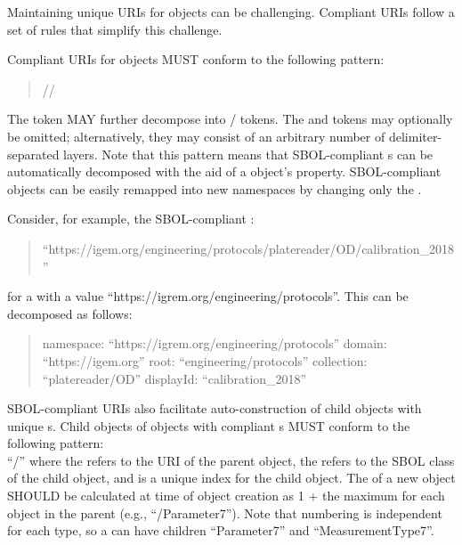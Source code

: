 Maintaining unique URIs for objects can be challenging.  Compliant URIs follow a set of rules that simplify this challenge.

Compliant URIs for  objects MUST conform to the following pattern:
\begin{quotation} 
//
\end{quotation}

The  token MAY further decompose into / tokens. The  and  tokens may optionally be omitted; alternatively, they may consist of an arbitrary number of delimiter-separated layers. Note that this pattern means that SBOL-compliant s can be automatically decomposed with the aid of a  object's  property. SBOL-compliant objects can be easily remapped into new namespaces by changing only the .

Consider, for example, the SBOL-compliant :
\begin{quote}``https://igem.org/engineering/protocols/platereader/OD/calibration\_2018''\end{quote} 
for a  with a  value ``https://igrem.org/engineering/protocols''.
This  can be decomposed as follows:
\begin{quote} 
namespace: ``https://igrem.org/engineering/protocols'' \linebreak
domain: ``https://igem.org'' \linebreak
root: ``engineering/protocols'' \linebreak
collection: ``platereader/OD'' \linebreak
displayId: ``calibration\_2018'' \linebreak
\end{quote}

SBOL-compliant URIs also facilitate auto-construction of child objects with unique s. 
Child objects of  objects with compliant s MUST conform to the following pattern:\\ ``/'' where the  refers to the URI of the parent object, the  refers to the SBOL class of the child object, and  is a unique index for the child object. 
The  of a new object SHOULD be calculated at time of object creation as 1 + the maximum  for each  object in the parent (e.g., ``/Parameter7''). 
Note that numbering is independent for each type, so a  can have children ``Parameter7'' and ``MeasurementType7''.

